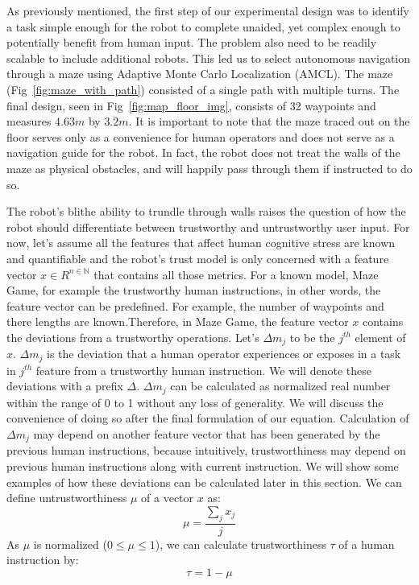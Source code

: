\documentclass{sig-alternate}
\begin{document}
As previously mentioned, the first step of our experimental design was
to identify a task simple enough for the robot to complete unaided,
yet complex enough to potentially benefit from human input. The
problem also need to be readily scalable to include additional
robots. This led us to select autonomous navigation through a maze
using Adaptive Monte Carlo Localization (AMCL). The maze
(Fig~\ref{fig:maze_with_path}) consisted of a single path with
multiple  turns.  The final design, seen in
Fig~\ref{fig:map_floor_img}, consists of 32 waypoints and measures
$4.63m$ by $3.2m$. It is important to note that the maze traced out on
the floor serves only as a convenience for human operators and does
not serve as a navigation guide for the robot. In fact, the robot does
not treat the walls of the maze as physical obstacles, and will
happily pass through them if instructed to do so.

The robot's blithe ability to trundle through walls raises the
question of how the robot should differentiate between trustworthy and untrustworthy user input. For now, let's assume all the features that affect human cognitive stress are known and quantifiable and the robot's trust model is only concerned with a feature vector $ x \in R^{n \in \mathbb{N}} $ that contains all those metrics. For a known model, Maze Game, for example the trustworthy human instructions, in other words, the feature vector can be predefined. For example, the number of waypoints and there lengths are known.Therefore, in Maze Game, the feature vector $x$ contains the deviations from a trustworthy operations. Let's $\Delta m_j$ to be the $ j^{th} $ element of $x$. $\Delta m_j$ is the deviation that a human operator experiences or exposes in a task in $ j^{th} $ feature from a trustworthy human instruction. We will denote these deviations with a prefix $\Delta$. $\Delta m_j$ can be calculated as normalized real number within the range of 0 to 1 without any loss of generality. We will discuss the convenience of doing so after the final formulation of our equation. Calculation of $\Delta m_j$ may depend on another feature vector that has been generated by the previous human instructions, because intuitively, trustworthiness may depend on previous human instructions along with current instruction. We will show some examples of how these deviations can be calculated later in this section. We can define untrustworthiness $\mu $ of a vector $x$ as:
\begin{equation}
  \label{eq:general_untrust}
  \mu=\dfrac{\sum_{j} x_j}{j}
\end{equation}
As $\mu$ is normalized ($0\leq \mu \leq 1$), we can calculate trustworthiness $\tau$ of a human instruction by:
\begin{equation}
  \label{eq:general_trust}
  \tau=1 - \mu
\end{equation}
\end{document}
